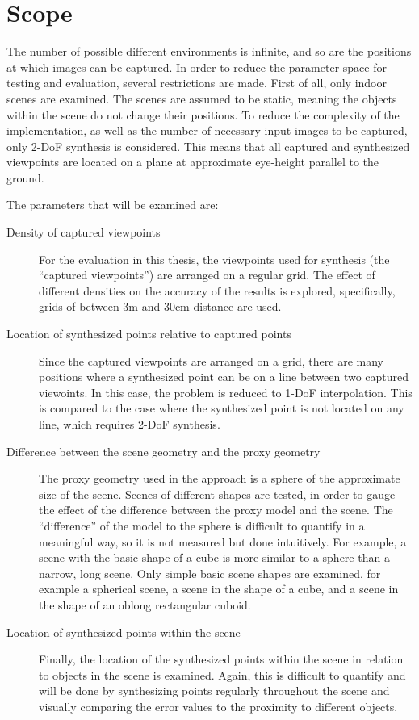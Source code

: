 \section*{Scope}
The number of possible different environments is infinite, and so are the positions at which images can be captured. In order to reduce the parameter space for testing and evaluation, several restrictions are made. First of all, only indoor scenes are examined. The scenes are assumed to be static, meaning the objects within the scene do not change their positions. To reduce the complexity of the implementation, as well as the number of necessary input images to be captured, only 2-DoF synthesis is considered. This means that all captured and synthesized viewpoints are located on a plane at approximate eye-height parallel to the ground. 


The parameters that will be examined are:
\begin{description}
  \item[Density of captured viewpoints] For the evaluation in this thesis, the viewpoints used for synthesis (the ``captured viewpoints'') are arranged on a regular grid. The effect of different densities on the accuracy of the results is explored, specifically, grids of between 3m and 30cm distance are used.
  \item[Location of synthesized points relative to captured points] Since the captured viewpoints are arranged on a grid, there are many positions where a synthesized point can be on a line between two captured viewoints. In this case, the problem is reduced to 1-DoF interpolation. This is compared to the case where the synthesized point is not located on any line, which requires 2-DoF synthesis.
  \item[Difference between the scene geometry and the proxy geometry] The proxy geometry used in the approach is a sphere of the approximate size of the scene. Scenes of different shapes are tested, in order to gauge the effect of the difference between the proxy model and the scene. The ``difference'' of the model to the sphere is difficult to quantify in a meaningful way, so it is not measured but done intuitively. For example, a scene with the basic shape of a cube is more similar to a sphere than a narrow, long scene. Only simple basic scene shapes are examined, for example a spherical scene, a scene in the shape of a cube, and a scene in the shape of an oblong rectangular cuboid.
  \item[Location of synthesized points within the scene] Finally, the location of the synthesized points within the scene in relation to objects in the scene is examined. Again, this is difficult to quantify and will be done by synthesizing points regularly throughout the scene and visually comparing the error values to the proximity to different objects.
\end{description}


